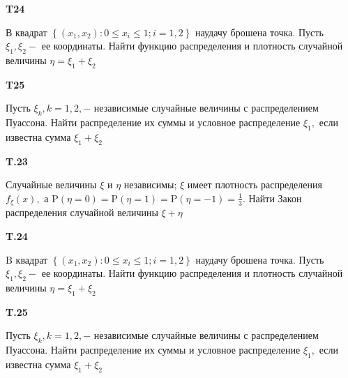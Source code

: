 \documentclass[a4paper,12pt]{article} %
\begin{document}
\begin{example}\textbf{T24}

В квадрат $\left\{\left(x_{1}, x_{2}\right): 0 \leqslant x_{i} \leqslant 1 ; i=1,2\right\}$ наудачу брошена точка. Пусть $\xi_{1}, \xi_{2}-$ ее координаты. Найти функцию распределения и плотность случайной величины $\eta=\xi_{1}+\xi_{2}$


\end{example}


\begin{example}\textbf{T25}

Пусть $\xi_{k}, k=1,2,-$ независимые случайные величины с распределением Пуассона. 
Найти распределение их суммы и условное распределение $\xi_{1},$ если известна сумма $\xi_{1}+\xi_{2}$


\end{example}



\begin{example}\textbf{T.23}

Случайные величины $\xi$ и $\eta$ независимы; $\xi$ имеет плотность распределения $f_{\xi}(x),$ а $\mathrm{P}(\eta=0)=\mathrm{P}(\eta=1)=\mathrm{P}(\eta=-1)=\frac{1}{3} .$ Найти Закон
распределения случайной величины $\xi+\eta$




\end{example}



\begin{example}\textbf{T.24}

$\mathrm{B}$ квадрат $\left\{\left(x_{1}, x_{2}\right): 0 \leqslant x_{i} \leqslant 1 ; i=1,2\right\}$ наудачу брошена точка. Пусть $\xi_{1}, \xi_{2}-$ ее координаты. Найти функцию распределения и плотность случайной величины $\eta=\xi_{1}+\xi_{2}$




\end{example}



\begin{example}\textbf{T.25}


Пусть $\xi_{k}, k=1,2,-$ независимые случайные величины с распределением Пуассона. 
Найти распределение их суммы и условное распределение $\xi_{1},$ если известна сумма $\xi_{1}+\xi_{2}$



\end{example}
\end{document}
